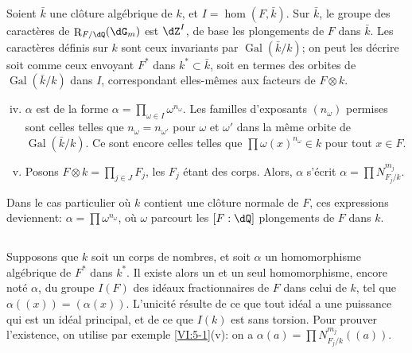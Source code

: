 \documentclass[oneside]{book}
\DeclareMathOperator{\gal}{Gal}
\DeclareMathOperator{\res}{R} %
\theoremstyle{sga-source}
\theoremstyle{sga-source-dash}
\theoremstyle{sga-source-dotdash}
\theoremstyle{sga-source-number-note-dash}
\theoremstyle{sga-source-note-number-dotdash}
\theoremstyle{sga-source-example-dotdash}
\theoremstyle{sga-source-inline-number}
\theoremstyle{sga-source-bare-number}
\theoremstyle{sga-source}
\newcommand{\PrintPage}[1]{}\newcommand{\MathPage}[1]{}\newcommand{\PrintCite}[2]{#1}\newcommand{\var}[3]{#2}
\begin{document}
Soient $\bar k$ une clôture algébrique de $k$, et $I=\hom(F,\bar k)$. Sur 
$\bar k$, le groupe des caractères de $\res_{F/\dQ}(\dG_m)$ est $\dZ^I$, de 
base les plongements de $F$ dans $\bar k$. Les caractères définis sur $k$ 
sont ceux invariants par $\gal(\bar k/k)$; on peut les décrire soit comme 
ceux envoyant $F^\ast$ dans $k^\ast\subset \bar k$, \var{soit en terme des orbites}{soit en termes des orbites}{S45-SOL-0866} de $\gal(\bar k/k)$ dans $I$, \var{correspondant elle-même}{correspondant elles-mêmes}{S45-SOL-0867} aux facteurs de 
$F\otimes k$. 
\begin{enumerate}[(i)]
\setcounter{enumi}{3}
  \item $\alpha$ est de la forme 
    $\alpha=\prod_{\omega\in I} \omega^{n_\omega}$. Les familles d'exposants 
    $(n_\omega)$ permises sont celles telles que $n_\omega=n_{\omega'}$ pour 
    $\omega$ et $\omega'$ dans la même orbite de $\gal(\bar k/k)$. Ce sont 
    encore \var{celles telle que}{celles telles que}{S45-SOL-0868} $\prod \omega(x)^{n_\omega}\in k$ pour tout 
    $x\in F$. 
  \PrintPage{209}
\item Posons $F\otimes k=\prod_{j\in J} F_j$, les $F_j$ étant des corps. 
    Alors, $\alpha$ s'écrit $\alpha=\prod N_{F_j/k}^{m_j}$. 
\end{enumerate}

Dans le cas particulier où $k$ contient une clôture normale de $F$, ces 
expressions deviennent: $\alpha=\prod \omega^{n_\omega}$, où $\omega$ 
parcourt les $[F:\dQ]$ plongements de $F$ dans $k$. 





\subsection{}\label{VI:5-2}

Supposons que $k$ soit un corps de nombres, et soit $\alpha$ un homomorphisme 
algébrique de \var{$F^\ast$ dand $k^\ast$}{$F^\ast$ dans $k^\ast$}{S45-SOL-0870}. Il existe alors un et un seul 
homomorphisme, encore noté $\alpha$, du groupe $I(F)$ des idéaux 
fractionnaires de $F$ dans celui de $k$, tel que $\alpha((x))=(\alpha(x))$. 
L'unicité résulte de ce que tout idéal a une puissance qui est un 
idéal principal, et de ce que $I(k)$ est sans torsion. Pour prouver 
l'existence, on utilise par exemple \ref{VI:5-1}(v): on a 
$\alpha(a) = \prod N_{F_j/k}^{m_j}((a))$. 
\end{document}
